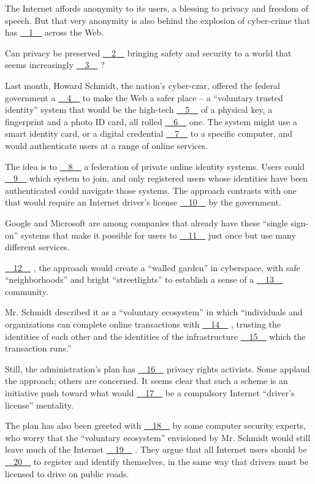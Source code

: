 The Internet affords anonymity to its users, a blessing to privacy and freedom of speech. But that very anonymity is also behind the explosion of cyber-crime that has \uline{~~1~~} across the Web.


Can privacy be preserved \uline{~~2~~} bringing safety and security to a world that seems increasingly \uline{~~3~~} ?


Last month, Howard Schmidt, the nation's cyber-czar, offered the federal government a \uline{~~4~~} to make the Web a safer place – a ``voluntary trusted identity'' system that would be the high-tech \uline{~~5~~} of a physical key, a fingerprint and a photo ID card, all rolled \uline{~~6~~} one. The system might use a smart identity card, or a digital credential \uline{~~7~~} to a specific computer, and would authenticate users at a range of online services.


The idea is to \uline{~~8~~} a federation of private online identity systems. Users could \uline{~~9~~} which system to join, and only registered users whose identities have been authenticated could navigate those systems. The approach contrasts with one that would require an Internet driver's license \uline{~~10~~} by the government.


Google and Microsoft are among companies that already have these ``single sign-on'' systems that make it possible for users to \uline{~~11~~} just once but use many different services.


\uline{~~12~~} , the approach would create a ``walled garden'' in cyberspace, with safe ``neighborhoods'' and bright ``streetlights'' to establish a sense of a \uline{~~13~~} community.


Mr. Schmidt described it as a ``voluntary ecosystem'' in which ``individuals and organizations can complete online transactions with \uline{~~14~~} , trusting the identities of each other and the identities of the infrastructure \uline{~~15~~} which the transaction runs.''


Still, the administration's plan has \uline{~~16~~} privacy rights activists. Some applaud the approach; others are concerned. It seems clear that such a scheme is an initiative push toward what would \uline{~~17~~} be a compulsory Internet ``driver's license'' mentality.


The plan has also been greeted with \uline{~~18~~} by some computer security experts, who worry that the ``voluntary ecosystem'' envisioned by Mr. Schmidt would still leave much of the Internet \uline{~~19~~} . They argue that all Internet users should be \uline{~~20~~} to register and identify themselves, in the same way that drivers must be licensed to drive on public roads.